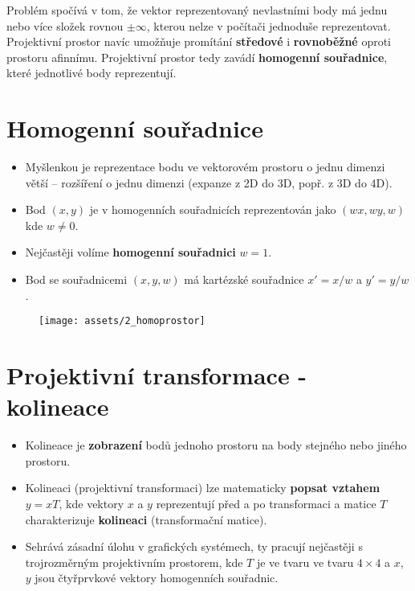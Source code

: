 Problém spočívá v tom, že vektor reprezentovaný nevlastními body má jednu nebo více složek rovnou $\pm \infty$, kterou nelze v počítači jednoduše reprezentovat. Projektivní prostor navíc umožňuje promítání \textbf{středové} i \textbf{rovnoběžné} oproti prostoru afinnímu. Projektivní prostor tedy zavádí \textbf{homogenní souřadnice}, které jednotlivé body reprezentují.

\section{Homogenní souřadnice}
\begin{itemize}
    \item Myšlenkou je reprezentace bodu ve vektorovém prostoru o jednu dimenzi větší -- rozšíření o jednu dimenzi (expanze z 2D do 3D, popř. z 3D do 4D).
    \item Bod $(x,y)$ je v homogenních souřadnicích reprezentován jako $(wx,wy,w)$ kde $w \not= 0$.
    \item Nejčastěji volíme \textbf{homogenní souřadnici} $w = 1$.
    \item Bod se souřadnicemi $(x, y, w)$ má kartézské souřadnice $x' = x/w$ a $y' = y/w$.
\end{itemize}
\begin{figure}[H]
    \centering
    \texttt{[image: assets/2\_homoprostor]}
\end{figure}

\section{Projektivní transformace - kolineace}
\begin{itemize}
    \item Kolineace je \textbf{zobrazení} bodů jednoho prostoru na body stejného nebo jiného prostoru.
    \item Kolineaci (projektivní transformaci) lze matematicky \textbf{popsat vztahem} $y = xT$, kde vektory $x$ a $y$ reprezentují před a po transformaci a matice $T$ charakterizuje \textbf{kolineaci} (transformační matice).
    \item Sehrává zásadní úlohu v grafických systémech, ty pracují nejčastěji s trojrozměrným projektivním prostorem, kde $T$ je ve tvaru  ve tvaru $4\times4$ a $x$, $y$ jsou čtyřprvkové vektory homogenních souřadnic.
\end{itemize}

